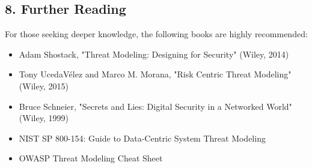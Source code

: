 \subsection*{8. Further Reading}
For those seeking deeper knowledge, the following books are highly recommended:
\begin{itemize}
	\item Adam Shostack, "Threat Modeling: Designing for Security" (Wiley, 2014)
	\item Tony UcedaVélez and Marco M. Morana, "Risk Centric Threat Modeling" (Wiley, 2015)
	\item Bruce Schneier, "Secrets and Lies: Digital Security in a Networked World" (Wiley, 1999)
	\item NIST SP 800-154: Guide to Data-Centric System Threat Modeling
	\item OWASP Threat Modeling Cheat Sheet
\end{itemize}
